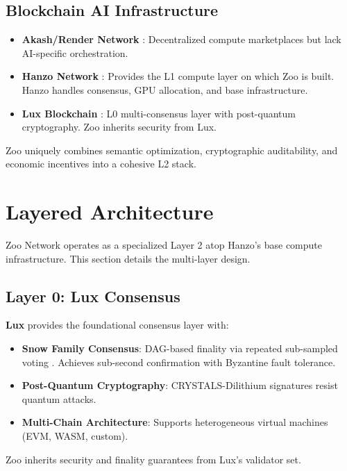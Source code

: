\documentclass[11pt,a4paper]{article}
\begin{document}
\subsection{Blockchain AI Infrastructure}

\begin{itemize}[leftmargin=*]
\item \textbf{Akash/Render Network} \cite{akash2021whitepaper}: Decentralized compute marketplaces but lack AI-specific orchestration.
\item \textbf{Hanzo Network} \cite{hanzo2025paper}: Provides the L1 compute layer on which Zoo is built. Hanzo handles consensus, GPU allocation, and base infrastructure.
\item \textbf{Lux Blockchain} \cite{lux2025whitepaper}: L0 multi-consensus layer with post-quantum cryptography. Zoo inherits security from Lux.
\end{itemize}

Zoo uniquely combines semantic optimization, cryptographic auditability, and economic incentives into a cohesive L2 stack.

\section{Layered Architecture}

Zoo Network operates as a specialized Layer 2 atop Hanzo's base compute infrastructure. This section details the multi-layer design.

\subsection{Layer 0: Lux Consensus}

\textbf{Lux} \cite{lux2025whitepaper} provides the foundational consensus layer with:

\begin{itemize}[leftmargin=*]
\item \textbf{Snow Family Consensus}: DAG-based finality via repeated sub-sampled voting \cite{rocket2020snowman}. Achieves sub-second confirmation with Byzantine fault tolerance.
\item \textbf{Post-Quantum Cryptography}: CRYSTALS-Dilithium signatures resist quantum attacks.
\item \textbf{Multi-Chain Architecture}: Supports heterogeneous virtual machines (EVM, WASM, custom).
\end{itemize}

Zoo inherits security and finality guarantees from Lux's validator set.
\end{document}
